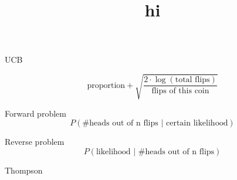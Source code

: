 \documentclass{article}
\title{hi}
\begin{document}
	UCB

	\[\text{proportion} + \sqrt{ \frac{2 \cdot \log(\text{total flips})} {\text{flips of this coin}}}\]

	Forward problem
	\[P(\text{\# heads out of n flips } | \text{ certain likelihood}) \]
	
	Reverse problem
	\[P(\text{likelihood } | \text{ \# heads out of n flips}) \]

	Thompson

	
\end{document}
